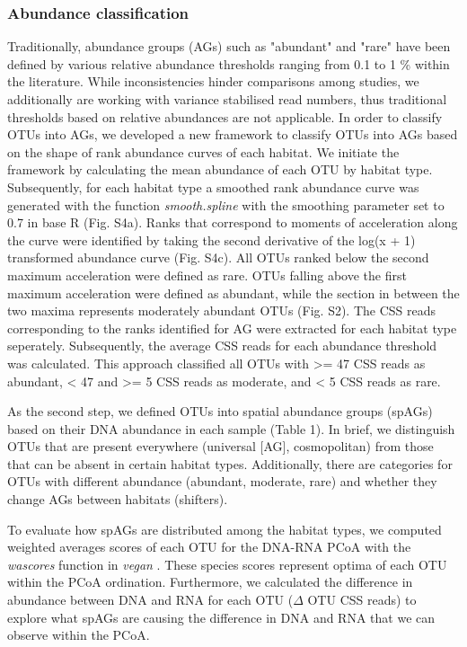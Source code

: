 \documentclass[12pt,a4paper]{article} %
\begin{document}
\subsubsection*{Abundance classification}
Traditionally, abundance groups (AGs) such as "abundant" and "rare" have been defined by various relative abundance thresholds ranging from 0.1 to 1 \% within the literature. While inconsistencies hinder comparisons among studies, we additionally are working with variance stabilised read numbers, thus traditional thresholds based on relative abundances are not applicable. In order to classify OTUs into AGs, we developed a new framework to classify OTUs into AGs based on the shape of rank abundance curves of each habitat. We initiate the framework by calculating the mean abundance of each OTU by habitat type. Subsequently, for each habitat type a smoothed rank abundance curve was generated with the function \textit{smooth.spline} with the smoothing parameter set to 0.7 in base R (Fig. S4a). Ranks that correspond to moments of acceleration along the curve were identified by taking the second derivative of the log(x + 1) transformed abundance curve (Fig. S4c). All OTUs ranked below the second maximum acceleration were defined as rare. OTUs falling above the first maximum acceleration were defined as abundant, while the section in between the two maxima represents moderately abundant OTUs (Fig. S2). The CSS reads corresponding to the ranks identified for AG were extracted for each habitat type seperately. Subsequently, the average CSS reads for each abundance threshold was calculated. This approach classified all OTUs with >= 47 CSS reads as abundant, < 47 and >= 5 CSS reads as moderate, and < 5 CSS reads as rare.

As the second step, we defined OTUs into spatial abundance groups (spAGs) based on their DNA abundance in each sample (Table 1). In brief, we distinguish OTUs that are present everywhere (universal [AG], cosmopolitan) from those that can be absent in certain habitat types. Additionally, there are categories for OTUs with different abundance (abundant, moderate, rare) and whether they change AGs between habitats (shifters).

To evaluate how spAGs are distributed among the habitat types, we computed weighted averages scores of each OTU for the DNA-RNA PCoA with the \textit{wascores} function in \textit{vegan} \citep{Oksanen2017}. These species scores represent optima of each OTU within the PCoA ordination. Furthermore, we calculated the difference in abundance between DNA and RNA for each OTU ($\Delta$ OTU CSS reads) to explore what spAGs are causing the difference in DNA and RNA that we can observe within the PCoA. \\[.3cm]
\end{document}
